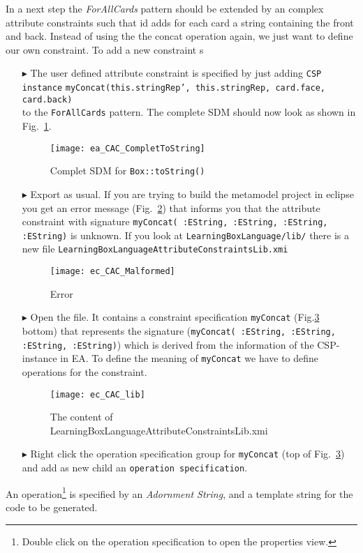 In a next step the \emph{ForAllCards} pattern should be extended by an complex attribute constraints such that id adds for each card a string containing the front and back.  	 
Instead of using the the concat operation again, we just want to define our own constraint. To add a new constraint s
\begin{itemize}
\item[$\blacktriangleright$] The user defined attribute constraint is specified by just adding \texttt{CSP instance}
\texttt{\small myConcat(this.stringRep', this.stringRep, card.face, card.back)}\\
to the \texttt{ForAllCards} pattern. The complete SDM should now look as shown in Fig.~\ref{ea_CAC_CompletToString}.

\begin{figure}[htbp]
\begin{center}
  \texttt{[image: ea\_CAC\_CompletToString]}
  \caption{Complet SDM for \texttt{Box::toString()}}  
  \label{ea_CAC_CompletToString}
\end{center}
\end{figure}
\item[$\blacktriangleright$] Export as usual. If you are trying to build the metamodel project in eclipse you get an error message (Fig.~\ref{ec_CAC_Malformed}) that informs you that the attribute constraint with signature \texttt{\small myConcat( :EString, :EString, :EString, :EString)} is unknown. If you look at \texttt{LearningBoxLanguage/lib/} there is a new file  \texttt{LearningBoxLanguageAttributeConstraintsLib.xmi} 
 
\begin{figure}[htbp]
\begin{center}
  \texttt{[image: ec\_CAC\_Malformed]}
  \caption{Error}  
  \label{ec_CAC_Malformed}
\end{center}
\end{figure}



\item[$\blacktriangleright$] Open the file. It contains a constraint specification \texttt{myConcat} (Fig.\ref{ec_CAC_lib} bottom) that represents the signature (\texttt{\small myConcat( :EString, :EString, :EString, :EString)}) which is derived from the information of the CSP-instance in EA. To define the meaning of \texttt{myConcat} we have to define operations for the constraint.
\begin{figure}[htbp]
\begin{center}
  \texttt{[image: ec\_CAC\_lib]}
  \caption{The content of LearningBoxLanguageAttributeConstraintsLib.xmi}  
  \label{ec_CAC_lib}
\end{center}
\end{figure}
\item[$\blacktriangleright$] Right click the operation specification group for \texttt{myConcat} (top of Fig.~\ref{ec_CAC_lib}) and add as new child an \texttt{operation specification}. 
\end{itemize}
An operation\footnote{Double click on the operation specification to open the properties view.} is specified by an \emph{Adornment String}, and a template string for the code to be generated.

